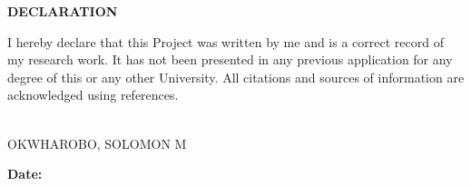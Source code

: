 \documentclass[12pt]{article}
\begin{document}
\begin{center}
    \textbf{\huge DECLARATION}
\end{center}

\vspace{1cm}

\noindent
I hereby declare that this Project was written by me and is a correct record of my research work. It has not been presented in any previous application for any degree of this or any other University. All citations and sources of information are acknowledged using references.

\vfill

\noindent
\makebox[3in]{\hrulefill} \\
OKWHAROBO, SOLOMON M \\

\vspace{1cm}

\noindent
\textbf{Date:} \makebox[2in]{\hrulefill}
\end{document}
